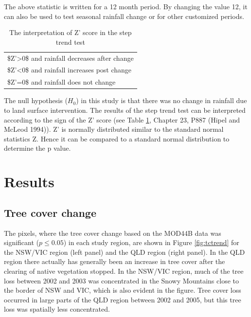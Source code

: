\documentclass[fleqn,10pt,lineno]{wlpeerj} %
\begin{document}
The above statistic is written for a 12 month period. By changing the
value 12, it can also be used to test seasonal rainfall change or for
other customized periods.

\begin{table}[t]

\caption{\label{tab:Zscore}The interpretation of Z' score in the step trend test}
\centering
\begin{tabular}{l}
\toprule
 \\
\midrule
\$Z'>0\$  and rainfall decreases after change\\
\$Z'<0\$ and rainfall increases post change\\
\$Z'=0\$ and rainfall does not change\\
\bottomrule
\end{tabular}
\end{table}

The null hypothesis (\(H_0\)) in this study is that there was no change
in rainfall due to land surface intervention. The results of the step
trend test can be interpreted according to the sign of the Z' score (see
Table \ref{tab:Zscore}, Chapter 23, P887 (Hipel and McLeod 1994)). Z' is
normally distributed similar to the standard normal statistics Z. Hence
it can be compared to a standard normal distribution to determine the p
value.

\section{Results}\label{results}

\subsection{Tree cover change}\label{tree-cover-change}

The pixels, where the tree cover change based on the MOD44B data was
significant (\(p \leq 0.05\)) in each study region, are shown in Figure
\ref{fig:tctrend} for the NSW/VIC region (left panel) and the QLD region
(right panel). In the QLD region there actually has generally been an
increase in tree cover after the clearing of native vegetation stopped.
In the NSW/VIC region, much of the tree loss between 2002 and 2003 was
concentrated in the Snowy Mountains close to the border of NSW and VIC,
which is also evident in the figure. Tree cover loss occurred in large
parts of the QLD region between 2002 and 2005, but this tree loss was
spatially less concentrated.
\end{document}

